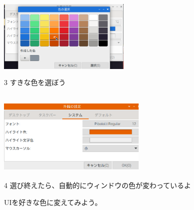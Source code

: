 \documentclass[a4paper,12pt]{jarticle}
\begin{document}
\begin{figure}
\begin{minipage}{\textwidth}
  \end{minipage}

  \begin{minipage}{\textwidth}

    \begin{minipage}{6.376cm}
      \includegraphics[width=6.347cm,height=4.084cm]{textbook-img1002.png}\\
      3 すきな色を選ぼう
    \end{minipage}
    \begin{minipage}{2.582cm}
    \end{minipage}
    \begin{minipage}{5.737cm}
      \includegraphics[width=7.145cm,height=4.451cm]{textbook-img1003.png}\\
      4 選び終えたら、自動的にウィンドウの色が変わっているよ
    \end{minipage}

    \bigskip

    \theQuestion
  
    UIを好きな色に変えてみよう。
  \end{minipage}


\end{figure}


\bigskip

\clearpage
\end{document}
